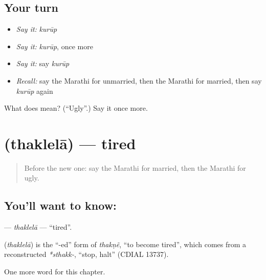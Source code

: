 \subsection*{Your turn}
\begin{itemize}
\raggedright
  \item \emph{Say it:} \emph{kurūp}
  \item \emph{Say it:} \emph{kurūp}, once more
  \item \emph{Say it:} say \emph{kurūp}
  \item \emph{Recall:} say the Marathi for unmarried, then the Marathi for married, then say \emph{kurūp} again
\end{itemize}

\begin{tcolorbox}[breakable,colback=teal!4,colframe=teal!35!black,title={Before you move on}]
What does  mean? (\textquotedblleft{}Ugly\textquotedblright{}.) Say it once more.
\end{tcolorbox}
\section[\texorpdfstring{\mr{थकलेला} (thaklelā)}{थकलेला (thaklelā)}]{ (thaklelā) — tired}

\label{lesson:MR-C261-thaklela}



\begin{quote}
Before the new one: say the Marathi for married, then the Marathi for ugly.
\end{quote}

\subsection*{You'll want to know: }
\textbf{} — \emph{thaklelā} — \textquotedblleft{}tired\textquotedblright{}.

\begin{cousinweb}
\textbf{} (\emph{thaklelā}) is the \textquotedblleft{}-ed\textquotedblright{} form of \emph{thakṇẽ}, \textquotedblleft{}to become tired\textquotedblright{}, which comes from a reconstructed \emph{*sthakk-}, \textquotedblleft{}stop, halt\textquotedblright{} (CDIAL 13737).
\end{cousinweb}

\begin{grammarlens}[title={What you've built}]
One more word for this chapter.
\end{grammarlens}

